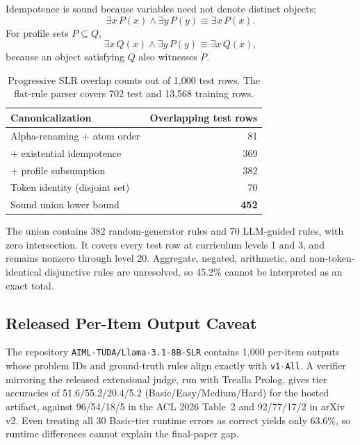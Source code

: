 Idempotence is sound because variables need not denote distinct objects:
\begin{equation}
\exists x\,P(x)\land\exists y\,P(y)
\equiv \exists x\,P(x).
\end{equation}
For profile sets $P\subseteq Q$,
\begin{equation}
\exists x\,Q(x)\land\exists y\,P(y)
\equiv \exists x\,Q(x),
\end{equation}
because an object satisfying $Q$ also witnesses $P$.

\begin{table}[H]
\caption{Progressive SLR overlap counts out of 1,000 test rows.  The flat-rule
parser covers 702 test and 13,568 training rows.}
\label{tab:slr-stages}
\centering
\small
\begin{tabular}{lr}
\toprule
Canonicalization & Overlapping test rows \\
\midrule
Alpha-renaming + atom order & 81 \\
+ existential idempotence & 369 \\
+ profile subsumption & 382 \\
Token identity (disjoint set) & 70 \\
\midrule
Sound union lower bound & \textbf{452} \\
\bottomrule
\end{tabular}
\end{table}

The union contains 382 random-generator rules and 70 LLM-guided rules, with
zero intersection.  It covers every test row at curriculum levels 1 and 3,
and remains nonzero through level 20.  Aggregate, negated, arithmetic, and
non-token-identical disjunctive rules are unresolved, so 45.2\% cannot be
interpreted as an exact total.

\subsection{Released Per-Item Output Caveat}

The repository \texttt{AIML-TUDA/Llama-3.1-8B-SLR} contains 1,000 per-item
outputs whose problem IDs and ground-truth rules align exactly with
\texttt{v1-All}.  A verifier mirroring the released extensional judge, run
with Trealla Prolog, gives tier accuracies of 51.6/55.2/20.4/5.2
(Basic/Easy/Medium/Hard) for the hosted artifact, against 96/54/18/5 in the
ACL 2026 Table~2 and 92/77/17/2 in arXiv v2.  Even treating all 30
Basic-tier runtime errors as correct yields only 63.6\%, so runtime
differences cannot explain the final-paper gap.

